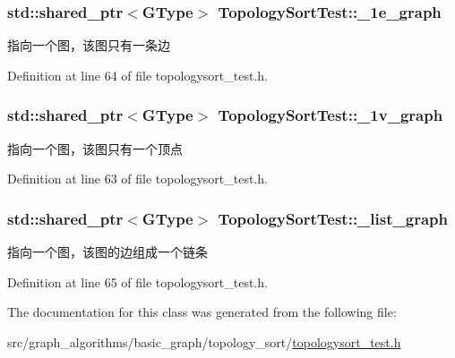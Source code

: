 \subsubsection[{\+\_\+1e\+\_\+graph}]{\setlength{\rightskip}{0pt plus 5cm}std\+::shared\+\_\+ptr$<${\bf G\+Type}$>$ Topology\+Sort\+Test\+::\+\_\+1e\+\_\+graph\hspace{0.3cm}{\ttfamily [protected]}}\label{class_topology_sort_test_af1fe553500cfb175b236a0302d9044af}
指向一个图，该图只有一条边 

Definition at line 64 of file topologysort\+\_\+test.\+h.

\hypertarget{class_topology_sort_test_a087401853f564307534465e2ac59c0ef}{}
\subsubsection[{\+\_\+1v\+\_\+graph}]{\setlength{\rightskip}{0pt plus 5cm}std\+::shared\+\_\+ptr$<${\bf G\+Type}$>$ Topology\+Sort\+Test\+::\+\_\+1v\+\_\+graph\hspace{0.3cm}{\ttfamily [protected]}}\label{class_topology_sort_test_a087401853f564307534465e2ac59c0ef}
指向一个图，该图只有一个顶点 

Definition at line 63 of file topologysort\+\_\+test.\+h.

\hypertarget{class_topology_sort_test_ac664dd33d2aa257a993c1835caa0d5ad}{}
\subsubsection[{\+\_\+list\+\_\+graph}]{\setlength{\rightskip}{0pt plus 5cm}std\+::shared\+\_\+ptr$<${\bf G\+Type}$>$ Topology\+Sort\+Test\+::\+\_\+list\+\_\+graph\hspace{0.3cm}{\ttfamily [protected]}}\label{class_topology_sort_test_ac664dd33d2aa257a993c1835caa0d5ad}
指向一个图，该图的边组成一个链条 

Definition at line 65 of file topologysort\+\_\+test.\+h.



The documentation for this class was generated from the following file\+:\begin{DoxyCompactItemize}
\item 
src/graph\+\_\+algorithms/basic\+\_\+graph/topology\+\_\+sort/\hyperlink{topologysort__test_8h}{topologysort\+\_\+test.\+h}\end{DoxyCompactItemize}
